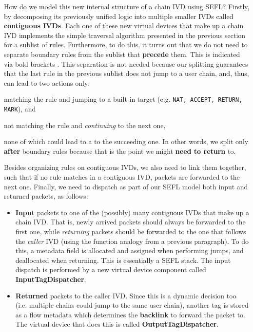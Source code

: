 How do we model this new internal structure of a chain IVD using SEFL?
Firstly, by decomposing its previously unified logic into multiple smaller IVDs
called \textbf{contiguous IVDs}. Each one of these new virtual devices that
make up a chain IVD implements the simple traversal algorithm presented in the
previous section for a sublist of rules.  Furthermore, to do this, it turns out
that we do not need to separate boundary rules from the sublist that
\textbf{precede} them.  This is indicated via bold brackets
.  This separation is not needed
because our splitting guarantees that the last rule in the previous sublist
does not jump to a user chain, and, thus, can lead to two actions only:
\begin{enumerate*}[a)]
  \item matching the rule and jumping to a built-in target (e.g. \texttt{NAT,
    ACCEPT, RETURN, MARK}), and
  \item not matching the rule and \emph{continuing} to the next one,
\end{enumerate*}
none of which could lead to a \RETURN to the succeeding one.  In other words,
we split only \textbf{after} boundary rules because that is the point we might
\textbf{need to return} to.

Besides organizing rules on contiguous IVDs, we also need to link them
together, such that if no rule matches in a contiguous IVD, packets are
forwarded to the next one.  Finally, we need to dispatch as part of our SEFL
model both input and returned packets, as follows:
\begin{itemize}
  \item \textbf{Input} packets to one of the (possibly) many contiguous IVDs
    that make up a chain IVD.  That is, newly arrived packets should always be
    forwarded to the first one, while \emph{returning} packets should be
    forwarded to the one that follows the \emph{caller} IVD (using the function
    analogy from a previous paragraph).  To do this, a metadata field is
    allocated and assigned when performing jumps, and deallocated when
    returning.  This is essentially a SEFL stack.  The input dispatch is
    performed by a new virtual device component called
    \textbf{InputTagDispatcher}.
  \item \textbf{Returned} packets to the caller IVD. Since this is a dynamic
    decision too (i.e. multiple chains could jump to the same user chain),
    another tag is stored as a flow metadata which determines the
    \textbf{backlink} to forward the packet to.  The virtual device that does
    this is called \textbf{OutputTagDispatcher}.
\end{itemize}


